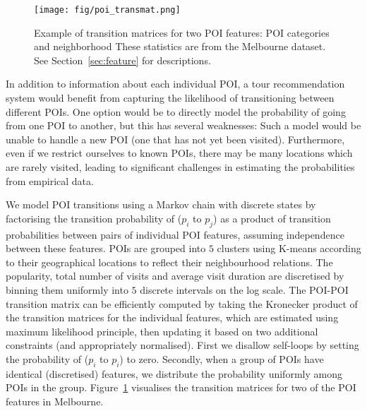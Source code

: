 

\begin{figure}[t]
\texttt{[image: fig/poi\_transmat.png]}
\caption{Example of transition matrices for two POI features: POI categories and neighborhood
These statistics are from the Melbourne dataset. See Section~\ref{sec:feature} for descriptions.}
\label{fig:transmat}\captionmoveup
\end{figure}


In addition to information about each individual POI, a tour recommendation system would benefit
from capturing the likelihood of transitioning between different POIs. One option would be to
directly model the probability of going from one POI to another, but this has several weaknesses:
Such a model would be unable to handle a new POI (one that has not yet been visited).
Furthermore, even if we restrict ourselves to known POIs, there may be many locations which
are rarely visited, leading to significant challenges in estimating the probabilities from
empirical data.

We model POI transitions using a Markov chain with discrete %
states by factorising the transition probability of ($p_i$ to $p_j$) %
as a product of transition probabilities between pairs of individual POI features, %
assuming independence between these features.
POIs are grouped into $5$ clusters using K-means according to their geographical locations to reflect their neighbourhood relations.
The popularity, total number of visits and average visit duration are discretised by binning
them uniformly into $5$ discrete intervals on the log scale.
The POI-POI transition matrix can be efficiently computed by taking the Kronecker product of
the transition matrices for the individual features, which are estimated using maximum likelihood principle, 
then updating it based on two additional constraints (and appropriately normalised).
First we disallow self-loops by setting the probability of ($p_i$ to $p_i$) to zero.
Secondly, when a group of POIs have identical (discretised) features, we distribute the probability uniformly among POIs in the group. 
Figure~\ref{fig:transmat} visualises the transition matrices for two of the POI features in Melbourne.
